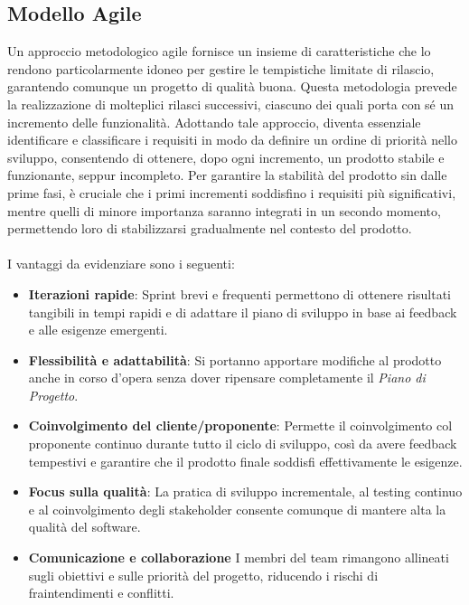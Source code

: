 \subsection{Modello Agile}
Un approccio metodologico agile fornisce un insieme di caratteristiche che lo rendono particolarmente idoneo per gestire le tempistiche limitate di rilascio, garantendo comunque un progetto di qualità buona.
Questa metodologia prevede la realizzazione di molteplici rilasci successivi, ciascuno dei quali porta con sé un incremento delle funzionalità. Adottando tale approccio, diventa essenziale identificare e classificare i requisiti in modo da definire un ordine di priorità nello sviluppo, consentendo di ottenere, dopo ogni incremento, un prodotto stabile e funzionante, seppur incompleto. Per garantire la stabilità del prodotto sin dalle prime fasi, è cruciale che i primi incrementi soddisfino i requisiti più significativi, mentre quelli di minore importanza saranno integrati in un secondo momento, permettendo loro di stabilizzarsi gradualmente nel contesto del prodotto.
\\\\
I vantaggi da evidenziare sono i seguenti:
\begin{itemize}
\setlength\itemsep{0em}
\item
\textbf{Iterazioni rapide}: Sprint brevi e frequenti permettono di ottenere risultati tangibili in tempi rapidi e di adattare il piano di sviluppo in base ai feedback e alle esigenze emergenti.
\item
\textbf{Flessibilità e adattabilità}: Si portanno apportare modifiche al prodotto anche in corso d'opera senza dover ripensare completamente il \textit{Piano di Progetto}.
\item
\textbf{Coinvolgimento del cliente/proponente}: Permette il coinvolgimento col proponente continuo durante tutto il ciclo di sviluppo, così da avere feedback tempestivi e garantire che il prodotto finale soddisfi effettivamente le esigenze.
\item
\textbf{Focus sulla qualità}: La pratica di sviluppo incrementale, al testing continuo e al coinvolgimento degli stakeholder consente comunque di mantere alta la qualità del software.
\item
\textbf{Comunicazione e collaborazione} I membri del team rimangono allineati sugli obiettivi e sulle priorità del progetto, riducendo i rischi di fraintendimenti e conflitti.
\end{itemize}
